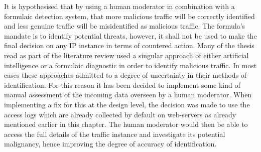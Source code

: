 It is hypothesised that by using a human moderator in combination with a formulaic detection system, that more malicious traffic will be correctly identified and less genuine traffic will be misidentified as malicious traffic. The formula's mandate is to identify potential threats, however, it shall not be used to make the final decision on any IP instance in terms of countered action. Many of the thesis read as part of the literature review used a singular approach of either artificial intelligence or a formulaic diagnostic in order to identify malicious traffic. In most cases these approaches admitted to a degree of uncertainty in their methods of identification. For this reason it has been decided to implement some kind of manual assessment of the incoming data overseen by a human moderator. When implementing a fix for this at the design level, the decision was made to use the access logs which are already collected by default on web-servers as already mentioned earlier in this chapter. The human moderator would then be able to access the full details of the traffic instance and investigate its potential malignancy, hence improving the degree of accuracy of identification.  

